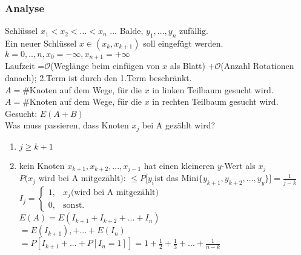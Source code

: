 \subsubsection{Analyse}
Schlüssel $x_1 < x_2 < ... < x_n$ ... Balde, $y_1,...,y_n$ zufällig.\\
Ein neuer Schlüssel $x \in (x_k, x_{k+1})$ soll eingefügt werden. $k=0,..,n, x_0 = -\infty, x_{n+1} = +\infty$\\
Laufzeit =$\mathcal{O}$(Weglänge beim einfügen von $x$ als Blatt) $+ \mathcal{O}$(Anzahl Rotationen danach); 2.Term ist durch den 1.Term beschränkt.\\
$A = \#$Knoten auf dem Wege, für die $x$ in linken Teilbaum gesucht wird.\\
$A = \#$Knoten auf dem Wege, für die $x$ in rechten Teilbaum gesucht wird.\\
Gesucht: $E(A+B)$\\
Was muss passieren, dass Knoten $x_j$ bei A gezählt wird?\\
\begin{enumerate}
\item $j \geq k+1$
\item kein Knoten $x_{k+1},x_{k+2},...,x_{j-1}$ hat einen kleineren $y$-Wert als $x_j$\\
$P(x_j$ wird bei A mitgezählt$)$: $\leq P [y_i$ist das Mini$\{y_{k+1}, y_{k+2},...,y_y  \}] = \frac{1}{j-k}$\\
$I_j = \begin{cases}1, &x_j \text{(wird bei A mitgezählt)} \\0, &\text{sonst.}\end{cases}$\\
$E(A) = E(I_{k+1}+I_{k+2}+...+I_n)$\\
$=E(I_{k+1}),+...+E(I_n)$\\
$=P[I_{k+1}+...+P[I_n=1]] = 1+ \frac{1}{2} + \frac{1}{3} + ... + \frac{1}{n-k}$\\
\end{enumerate}  